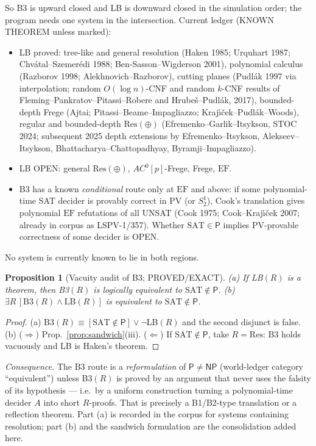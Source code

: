 \documentclass[11pt]{article}
\newtheorem{proposition}[theorem]{Proposition}
\theoremstyle{definition}
\newcommand{\SAT}{\mathrm{SAT}}
\newcommand{\Res}{\mathrm{Res}}
\newcommand{\EF}{\mathrm{EF}}
\begin{document}
So B3 is upward closed and LB is downward closed in the simulation order; the
program needs one system in the intersection. Current ledger
(KNOWN THEOREM unless marked):
\begin{itemize}
\item LB proved: tree-like and general resolution (Haken 1985; Urquhart 1987;
Chv\'atal--Szemer\'edi 1988; Ben-Sasson--Wigderson 2001), polynomial calculus
(Razborov 1998; Alekhnovich--Razborov), cutting planes (Pudl\'ak 1997 via
interpolation; random $O(\log n)$-CNF and random $k$-CNF results of
Fleming--Pankratov--Pitassi--Robere and Hrube\v{s}--Pudl\'ak, 2017),
bounded-depth Frege (Ajtai; Pitassi--Beame--Impagliazzo; Kraj\'\i\v{c}ek--Pudl\'ak--Woods),
regular and bounded-depth $\Res(\oplus)$ (Efremenko--Garlik--Itsykson, STOC 2024;
subsequent 2025 depth extensions by Efremenko--Itsykson, Alekseev--Itsykson,
Bhattacharya--Chattopadhyay, Byramji--Impagliazzo).
\item LB OPEN: general $\Res(\oplus)$, $AC^0[p]$-Frege, Frege, $\EF$.
\item B3 has a known \emph{conditional} route only at $\EF$ and above:
if some polynomial-time SAT decider is provably correct in PV (or $S^1_2$),
Cook's translation gives polynomial $\EF$ refutations of all UNSAT
(Cook 1975; Cook--Kraj\'\i\v{c}ek 2007; already in corpus as LSPV-1/357).
Whether $\SAT\in\mathsf P$ implies PV-provable correctness of some decider is OPEN.
\end{itemize}
No system is currently known to lie in both regions.

\begin{proposition}[Vacuity audit of B3; PROVED/EXACT]\label{prop:vacuity}
(a) If LB$(R)$ is a theorem, then B3$(R)$ is logically equivalent to
$\SAT\notin\mathsf P$. (b) $\exists R\,[\mathrm{B3}(R)\wedge\mathrm{LB}(R)]$ is
equivalent to $\SAT\notin\mathsf P$.
\end{proposition}
\begin{proof}(a) B3$(R)\equiv[\SAT\notin\mathsf P]\vee\neg$LB$(R)$ and the second
disjunct is false. (b) ($\Rightarrow$) Prop.~\ref{prop:sandwich}(iii).
($\Leftarrow$) If $\SAT\notin\mathsf P$, take $R=\Res$: B3 holds vacuously and LB
is Haken's theorem. \end{proof}

\noindent\emph{Consequence.} The B3 route is a \emph{reformulation} of
$\mathsf P\ne\mathsf{NP}$ (world-ledger category ``equivalent'') unless B3$(R)$ is
proved by an argument that never uses the falsity of its hypothesis --- i.e.\
by a uniform construction turning a polynomial-time decider $A$ into short
$R$-proofs. That is precisely a B1/B2-type translation or a reflection
theorem. Part (a) is recorded in the corpus for systems containing resolution;
part (b) and the sandwich formulation are the consolidation added here.
\end{document}
